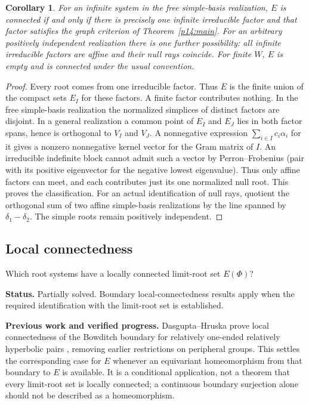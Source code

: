 \documentclass[11pt,reqno]{amsart}
\theoremstyle{plain}
\newtheorem{corollary}[theorem]{Corollary}
\theoremstyle{definition}
\theoremstyle{remark}
\numberwithin{equation}{section}
\begin{document}
\begin{corollary}\label{p14:reducible}
For an infinite system in the free simple-basis realization, $E$ is connected if and only if there is precisely one infinite irreducible factor and that factor satisfies the graph criterion of Theorem~\ref{p14:main}. For an arbitrary positively independent realization there is one further possibility: all infinite irreducible factors are affine and their null rays coincide. For finite $W$, $E$ is empty and is connected under the usual convention.
\end{corollary}
\begin{proof}
Every root comes from one irreducible factor. Thus $E$ is the finite union of the compact sets $E_I$ for these factors. A finite factor contributes nothing. In the free simple-basis realization the normalized simplices of distinct factors are disjoint. In a general realization a common point of $E_I$ and $E_J$ lies in both factor spans, hence is orthogonal to $V_I$ and $V_J$. A nonnegative expression $\sum_{i\in I}c_i\alpha_i$ for it gives a nonzero nonnegative kernel vector for the Gram matrix of $I$. An irreducible indefinite block cannot admit such a vector by Perron--Frobenius (pair with its positive eigenvector for the negative lowest eigenvalue). Thus only affine factors can meet, and each contributes just its one normalized null root. This proves the classification. For an actual identification of null rays, quotient the orthogonal sum of two affine simple-basis realizations by the line spanned by $\delta_1-\delta_2$. The simple roots remain positively independent.
\end{proof}

\subsection{Local connectedness}
Which root systems have a locally connected limit-root set $E(\Phi)$?


\par\medskip
\noindent\textbf{Status.} Partially solved. Boundary local-connectedness results apply when the required identification with the limit-root set is established.

\par\medskip
\noindent\textbf{Previous work and verified progress.}
Dasgupta--Hruska prove local connectedness of the Bowditch boundary
for relatively one-ended relatively hyperbolic pairs
\cite{DH2024}, removing earlier restrictions on peripheral groups.
This settles the corresponding case for $E$ whenever an equivariant
homeomorphism from that boundary to $E$ is available. It is a conditional
application, not a theorem that every limit-root set is locally connected;
a continuous boundary surjection alone should not be described as a
homeomorphism.
\end{document}
